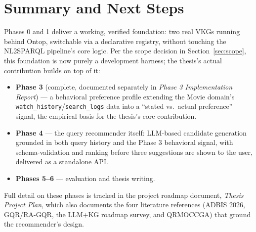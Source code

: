 \documentclass[11pt,a4paper]{article}
\newcommand{\code}[1]{\texttt{#1}}
\begin{document}
\section{Summary and Next Steps}

Phases 0 and 1 deliver a working, verified foundation: two real VKGs running behind Ontop,
switchable via a declarative registry, without touching the NL2SPARQL pipeline's core logic. Per
the scope decision in Section~\ref{sec:scope}, this foundation is now purely a development
harness; the thesis's actual contribution builds on top of it:

\begin{itemize}
    \item \textbf{Phase 3} (complete, documented separately in \emph{Phase 3 Implementation
        Report}) --- a behavioral preference profile extending the Movie domain's
        \code{watch\_history}\slash\code{search\_logs} data into a ``stated vs.\ actual preference''
        signal, the empirical basis for the thesis's core contribution.
    \item \textbf{Phase 4} --- the query recommender itself: LLM-based candidate generation
        grounded in both query history and the Phase 3 behavioral signal, with schema-validation
        and ranking before three suggestions are shown to the user, delivered as a standalone API.
    \item \textbf{Phases 5--6} --- evaluation and thesis writing.
\end{itemize}

\noindent Full detail on these phases is tracked in the project roadmap document,
\emph{Thesis Project Plan}, which also documents the four literature references (ADBIS 2026,
GQR/RA-GQR, the LLM+KG roadmap survey, and QRMOCCGA) that ground the recommender's design.
\end{document}
